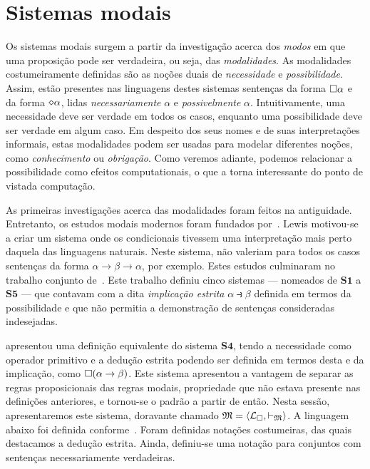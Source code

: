 \section{Sistemas modais}
    Os sistemas modais surgem a partir da investigação acerca dos \emph{modos} em que uma proposição pode ser verdadeira, ou seja, das \emph{modalidades}.
    As modalidades costumeiramente definidas são as noções duais de \emph{necessidade} e \emph{possibilidade}.
    Assim, estão presentes nas linguagens destes sistemas sentenças da forma $\Box\alpha$ e da forma $\pos\alpha$, lidas \emph{necessariamente} $\alpha$ e \emph{possivelmente} $\alpha$.
    Intuitivamente, uma necessidade deve ser verdade em todos os casos, enquanto uma possibilidade deve ser verdade em algum caso.
    Em despeito dos seus nomes e de suas interpretações informais, estas modalidades podem ser usadas para modelar diferentes noções, como \emph{conhecimento} ou \emph{obrigação}.
    Como veremos adiante, podemos relacionar a possibilidade como efeitos computationais, o que a torna interessante do ponto de vistada computação.

    \vspace{.3\baselineskip}
    As primeiras investigações acerca das modalidades foram feitos na antiguidade.
    Entretanto, os estudos modais modernos foram fundados por~\cite{Lewis}.
    Lewis motivou-se a criar um sistema onde os condicionais tivessem uma interpretação mais perto daquela das linguagens naturais.
    Neste sistema, não valeriam para todos os casos sentenças da forma $\alpha\to\beta\to\alpha$, por exemplo.
    Estes estudos culminaram no trabalho conjunto de~\cite{Langford}.
    Este trabalho definiu cinco sistemas --- nomeados de $\mathbf{S1}$ a $\mathbf{S5}$ --- que contavam com a dita \emph{implicação estrita} $\alpha\strictif\beta$ definida em termos da possibilidade e que não permitia a demonstração de sentenças consideradas indesejadas.

    \vspace{.3\baselineskip}
    \cite{Goedel} apresentou uma definição equivalente do sistema $\mathbf{S4}$, tendo a necessidade como operador primitivo e a dedução estrita podendo ser definida em termos desta e da implicação, como $\Box(\alpha\to\beta)$.
    Este sistema apresentou a vantagem de separar as regras proposicionais das regras modais, propriedade que não estava presente nas definições anteriores, e tornou-se o padrão a partir de então.
    Nesta sessão, apresentaremos este sistema, doravante chamado $\mathfrak{M}=\langle\mathcal{L}_\Box,\vdash_\mathfrak{M}\rangle$.
    A linguagem abaixo foi definida conforme~\cite{Troelstra}.
    Foram definidas notações costumeiras, das quais destacamos a dedução estrita.
    Ainda, definiu-se uma notação para conjuntos com sentenças necessariamente verdadeiras.

